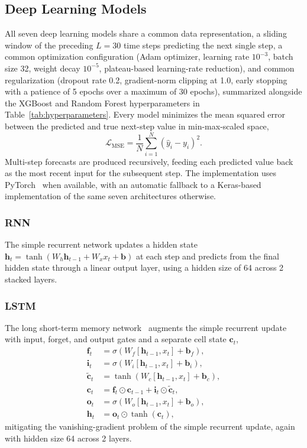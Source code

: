 \subsection{Deep Learning Models}
\label{subsec:dl-models}
All seven deep learning models share a common data representation, a sliding window of the preceding $L=30$ time steps predicting the next single step, a common optimization configuration (Adam optimizer, learning rate $10^{-3}$, batch size 32, weight decay $10^{-5}$, plateau-based learning-rate reduction), and common regularization (dropout rate 0.2, gradient-norm clipping at 1.0, early stopping with a patience of 5 epochs over a maximum of 30 epochs), summarized alongside the XGBoost and Random Forest hyperparameters in Table~\ref{tab:hyperparameters}. Every model minimizes the mean squared error between the predicted and true next-step value in min-max-scaled space,
\begin{equation}
\label{eq:mse-loss}
\mathcal{L}_{\text{MSE}} = \frac{1}{N}\sum_{i=1}^{N}\left(\hat{y}_i - y_i\right)^2 .
\end{equation}
Multi-step forecasts are produced recursively, feeding each predicted value back as the most recent input for the subsequent step. The implementation uses PyTorch~\cite{paszke2019pytorch} when available, with an automatic fallback to a Keras-based implementation of the same seven architectures otherwise.



\subsubsection{RNN}
The simple recurrent network updates a hidden state $\mathbf{h}_t = \tanh(W_h \mathbf{h}_{t-1} + W_x x_t + \mathbf{b})$ at each step and predicts from the final hidden state through a linear output layer, using a hidden size of 64 across 2 stacked layers.

\subsubsection{LSTM}
The long short-term memory network~\cite{hochreiter1997lstm,gers2000forget} augments the simple recurrent update with input, forget, and output gates and a separate cell state $\mathbf{c}_t$,
\begin{align}
\mathbf{f}_t &= \sigma(W_f[\mathbf{h}_{t-1},x_t]+\mathbf{b}_f), \\
\mathbf{i}_t &= \sigma(W_i[\mathbf{h}_{t-1},x_t]+\mathbf{b}_i), \\
\tilde{\mathbf{c}}_t &= \tanh(W_c[\mathbf{h}_{t-1},x_t]+\mathbf{b}_c), \\
\mathbf{c}_t &= \mathbf{f}_t \odot \mathbf{c}_{t-1} + \mathbf{i}_t \odot \tilde{\mathbf{c}}_t, \\
\mathbf{o}_t &= \sigma(W_o[\mathbf{h}_{t-1},x_t]+\mathbf{b}_o), \\
\mathbf{h}_t &= \mathbf{o}_t \odot \tanh(\mathbf{c}_t), \label{eq:lstm}
\end{align}
mitigating the vanishing-gradient problem of the simple recurrent update, again with hidden size 64 across 2 layers.

